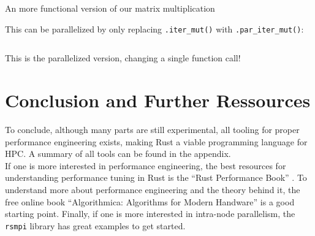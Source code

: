 \begin{listing}[H]
  \inputminted{rust}{./assets/02rayon.rs}
\caption{An more functional version of our matrix multiplication}
\end{listing}

This can be parallelized by only replacing \texttt{.iter\_mut()} with \texttt{.par\_iter\_mut()}:

\begin{listing}[H]
  \inputminted{rust}{./assets/03rayon.rs}
\caption{This is the parallelized version, changing a single function call!}
\end{listing}

\section{Conclusion and Further Ressources}

To conclude, although many parts are still experimental, all tooling for proper performance engineering exists, making Rust a viable programming language for \ac{HPC}. A summary of all tools can be found in the appendix.\\

If one is more interested in performance engineering, the best resources for understanding performance tuning in Rust is the ``Rust Performance Book'' \cite{rperfbook}. To understand more about performance engineering and the theory behind it, the free online book ``Algorithmica: Algorithms for Modern Handware'' \cite{algomodern} is a good starting point. Finally, if one is more interested in intra-node parallelism, the \texttt{rsmpi} library \cite{rsmpi} has great examples to get started.

